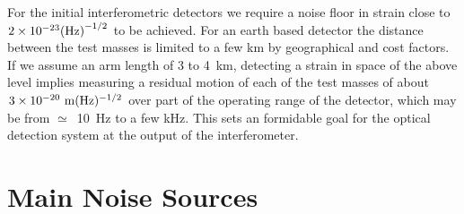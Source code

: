 \documentclass{article}
\begin{document}

For the initial interferometric detectors we require a noise floor in
strain close to $2 \times 10^{-23}{(\rm Hz)}^{-1/2}$ to be
achieved. For an earth based detector the distance between the test
masses is limited to a few km by geographical and cost factors. If we
assume an arm length of 3 to 4~km, detecting a strain in space of the
above level implies measuring a residual motion of each of the test
masses of about $3 \times 10^{-20} {\rm \ m}(\rm Hz)^{-1/2}$ over part
of the operating range of the detector, which may be from
$\simeq$~10~Hz to a few kHz. This sets an formidable goal for the
optical detection system at the output of the interferometer.




\newpage

\section{Main Noise Sources}
\label{section:noise}
\end{document}

